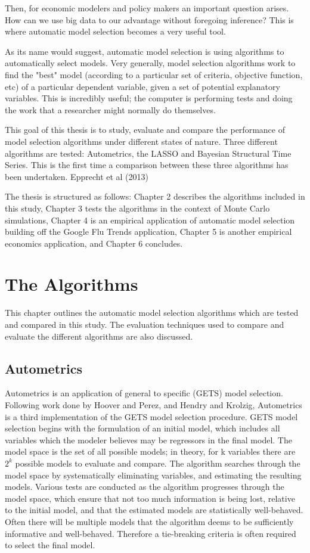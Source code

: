 \documentclass[11pt, oneside]{book}   	%
\begin{document}
Then, for economic modelers and policy makers an important question arises. How can we use big data to our advantage without foregoing inference? This is where automatic model selection becomes a very useful tool. 

As its name would suggest, automatic model selection is using algorithms to automatically select models. Very generally, model selection algorithms work to find the "best" model (according to a particular set of criteria, objective function, etc) of a particular dependent variable, given a set of potential explanatory variables. This is incredibly useful; the computer is performing tests and doing the work that a researcher might normally do themselves. 

This goal of this thesis is to study, evaluate and compare the performance of model selection algorithms under different states of nature. Three different algorithms are tested: Autometrics, the LASSO and Bayesian Structural Time Series. This is the first time a comparison between these three algorithms has been undertaken. Epprecht et al (2013) 

The thesis is structured as follows: Chapter 2 describes the algorithms included in this study, Chapter 3 tests the algorithms in the context of Monte Carlo simulations, Chapter 4 is an empirical application of automatic model selection building off the Google Flu Trends application, Chapter 5 is another empirical economics application, and Chapter 6 concludes. 


\chapter{The Algorithms}

This chapter outlines the automatic model selection algorithms which are tested and compared in this study. The evaluation techniques used to compare and evaluate the different algorithms are also discussed. 


\section{Autometrics}

Autometrics is an application of general to specific (GETS) model selection. Following work done by Hoover and Perez, and Hendry and Krolzig, Autometrics is a third implementation of the GETS model selection procedure. GETS model selection begins with the formulation of an initial model, which includes all variables which the modeler believes may be regressors in the final model. The model space is the set of all possible models; in theory, for k variables there are $2^{k}$ possible models to evaluate and compare. The algorithm searches through the model space by systematically eliminating variables, and estimating the resulting models. Various tests are conducted as the algorithm progresses through the model space, which ensure that not too much information is being lost, relative to the initial model, and that the estimated models are statistically well-behaved. Often there will be multiple models that the algorithm deems to be sufficiently informative and well-behaved. Therefore a tie-breaking criteria is often required to select the final model. 
\end{document}
